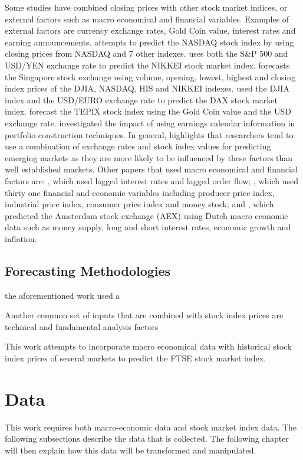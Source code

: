 \documentclass{UoYCSproject}
\begin{document}
Some studies have combined closing prices with other stock market indices, or external factors such as macro economical and financial variables. Examples of external factors are currency exchange rates, Gold Coin value, interest rates and earning announcements. \cite{ajith2003hybrid} attempts to predict the NASDAQ stock index by using closing prices from NASDAQ and 7 other indexes. \cite{huang2005forecasting} uses both the S\&P 500 and USD/YEN exchange rate to predict the NIKKEI stock market index. \cite{phua2001neural} forecasts the Singapore stock exchange using volume, opening, lowest, highest and closing index prices of the DJIA, NASDAQ, HIS and NIKKEI indexes. \cite{siekmann1999information} used the DJIA index and the USD/EURO exchange rate to predict the DAX stock market index. \cite{tabrizi2000stock} forecast the TEPIX stock index using the Gold Coin value and the USD exchange rate. \cite{levodeanschi2016} investigated the impact of using earnings calendar information in portfolio construction techniques. In general, \cite{atsalakis2009surveying} highlights that researchers tend to use a combination of exchange rates and stock index values for predicting emerging markets as they are more likely to be influenced by these factors than well established markets. Other papers that used macro economical and financial factors are: \cite{gradojevic2002neuro}, which used lagged interest rates and lagged order flow; \cite{thawornwong2004adaptive}, which used thirty one financial and economic variables including producer price index, industrial price index, consumer price index and money stock; and \cite{setnes1999fuzzy}, which predicted the Amsterdam stock exchange (AEX) using Dutch macro economic data such as money supply, long and short interest rates, economic growth and inflation. 

\subsection{Forecasting Methodologies}
the aforementioned work used a 



Another common set of inputs that are combined with stock index prices are technical and fundamental analysis factors

This work attempts to incorporate macro economical data with historical stock index prices of several markets to predict the FTSE stock market index.



\section{Data}
This work requires both macro-economic data and stock market index data. The following subsections describe the data that is collected. The following chapter will then explain how this data will be transformed and manipulated.
\end{document}
